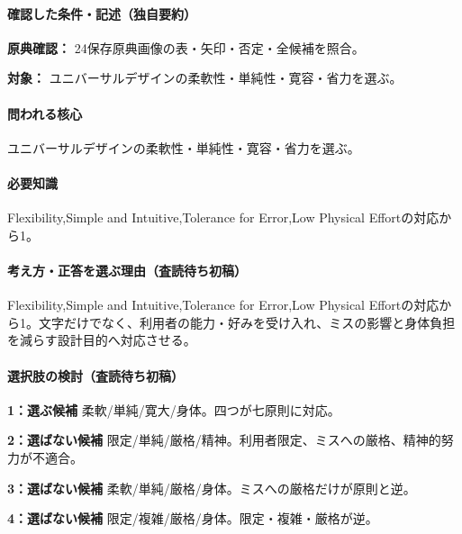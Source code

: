 \paragraph{確認した条件・記述（独自要約）}\mbox{}\par

\noindent\textbf{原典確認：} 24保存原典画像の表・矢印・否定・全候補を照合。\par

\noindent\textbf{対象：} ユニバーサルデザインの柔軟性・単純性・寛容・省力を選ぶ。\par

\paragraph{問われる核心} ユニバーサルデザインの柔軟性・単純性・寛容・省力を選ぶ。

\paragraph{必要知識} Flexibility,Simple and Intuitive,Tolerance for Error,Low Physical Effortの対応から1。

\paragraph{考え方・正答を選ぶ理由（査読待ち初稿）} Flexibility,Simple and Intuitive,Tolerance for Error,Low Physical Effortの対応から1。文字だけでなく、利用者の能力・好みを受け入れ、ミスの影響と身体負担を減らす設計目的へ対応させる。

\paragraph{選択肢の検討（査読待ち初稿）}\mbox{}\par

\noindent\textbf{1：選ぶ候補} 柔軟/単純/寛大/身体。四つが七原則に対応。\par

\noindent\textbf{2：選ばない候補} 限定/単純/厳格/精神。利用者限定、ミスへの厳格、精神的努力が不適合。\par

\noindent\textbf{3：選ばない候補} 柔軟/単純/厳格/身体。ミスへの厳格だけが原則と逆。\par

\noindent\textbf{4：選ばない候補} 限定/複雑/厳格/身体。限定・複雑・厳格が逆。\par

